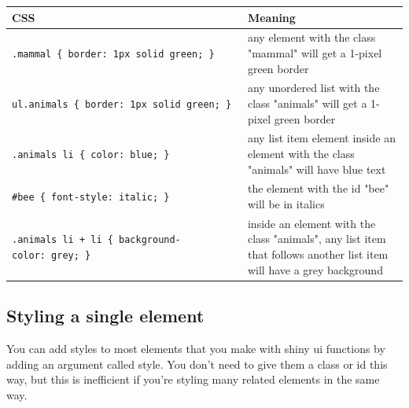 \documentclass[
  oneside]{book}
\newenvironment{Shaded}{\begin{snugshade}}{\end{snugshade}}
\newcommand{\AttributeTok}[1]{\textcolor[rgb]{0.77,0.63,0.00}{#1}}
\newcommand{\FunctionTok}[1]{\textcolor[rgb]{0.00,0.00,0.00}{#1}}
\newcommand{\NormalTok}[1]{#1}
\newcommand{\SpecialCharTok}[1]{\textcolor[rgb]{0.00,0.00,0.00}{#1}}
\newcommand{\StringTok}[1]{\textcolor[rgb]{0.31,0.60,0.02}{#1}}
\begin{document}
\begin{longtable}[]{@{}
  >{\raggedright\arraybackslash}p{}
  >{\raggedright\arraybackslash}p{}@{}}
\toprule
CSS & Meaning \\
\midrule
\endhead
\texttt{.mammal\ \{\ border:\ 1px\ solid\ green;\ \}} & any element with the \AttributeTok{class} \StringTok{"mammal"} will get a 1-pixel green border \\
\texttt{ul.animals\ \{\ border:\ 1px\ solid\ green;\ \}} & any unordered list with the \AttributeTok{class} \StringTok{"animals"} will get a 1-pixel green border \\
\texttt{.animals\ li\ \{\ color:\ blue;\ \}} & any list item element inside an element with the \AttributeTok{class} \StringTok{"animals"} will have blue text \\
\texttt{\#bee\ \{\ font-style:\ italic;\ \}} & the element with the \AttributeTok{id} \StringTok{"bee"} will be in italics \\
\texttt{.animals\ li\ +\ li\ \{\ background-color:\ grey;\ \}} & inside an element with the \AttributeTok{class} \StringTok{"animals"}, any list item that follows another list item will have a grey background \\
\bottomrule
\end{longtable}

\hypertarget{styling-a-single-element}{%
\subsection{Styling a single element}\label{styling-a-single-element}}

You can add styles to most elements that you make with shiny ui functions by adding an argument called \AttributeTok{style}. You don't need to give them a \NormalTok{class} or \NormalTok{id} this way, but this is inefficient if you're styling many related elements in the same way.

\begin{Shaded}
\end{Shaded}
\end{document}
